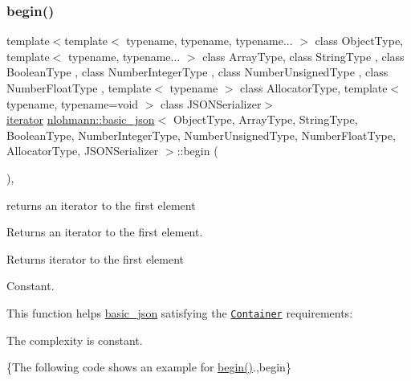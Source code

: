 \subsubsection{\texorpdfstring{begin()}{begin()}\hspace{0.1cm}{\footnotesize\ttfamily [1/2]}}
{\footnotesize\ttfamily template$<$template$<$ typename, typename, typename... $>$ class Object\+Type, template$<$ typename, typename... $>$ class Array\+Type, class String\+Type , class Boolean\+Type , class Number\+Integer\+Type , class Number\+Unsigned\+Type , class Number\+Float\+Type , template$<$ typename $>$ class Allocator\+Type, template$<$ typename, typename=void $>$ class J\+S\+O\+N\+Serializer$>$ \\
\hyperlink{classnlohmann_1_1basic__json_a099316232c76c034030a38faa6e34dca}{iterator} \hyperlink{classnlohmann_1_1basic__json}{nlohmann\+::basic\+\_\+json}$<$ Object\+Type, Array\+Type, String\+Type, Boolean\+Type, Number\+Integer\+Type, Number\+Unsigned\+Type, Number\+Float\+Type, Allocator\+Type, J\+S\+O\+N\+Serializer $>$\+::begin (\begin{DoxyParamCaption}{ }\end{DoxyParamCaption})\hspace{0.3cm}{\ttfamily [inline]}, {\ttfamily [noexcept]}}



returns an iterator to the first element 

Returns an iterator to the first element.

 \begin{DoxyReturn}{Returns}
iterator to the first element
\end{DoxyReturn}
Constant.

This function helps {\ttfamily \hyperlink{classnlohmann_1_1basic__json}{basic\+\_\+json}} satisfying the \href{http://en.cppreference.com/w/cpp/concept/Container}{\tt Container} requirements\+:
\begin{DoxyItemize}
\item The complexity is constant.
\end{DoxyItemize}

\{The following code shows an example for {\ttfamily \hyperlink{classnlohmann_1_1basic__json_a0ff28dac23f2bdecee9564d07f51dcdc}{begin()}}.,begin\}

